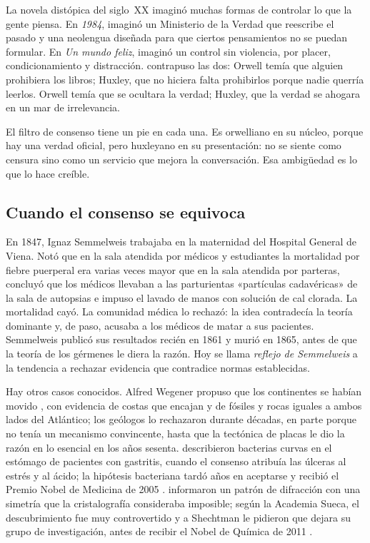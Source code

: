 \documentclass[11pt,a4paper]{article}
\begin{document}
La novela distópica del siglo~XX imaginó muchas formas de controlar lo que la gente piensa. En \emph{1984}, \textcite{orwell1949} imaginó un Ministerio de la Verdad que reescribe el pasado y una neolengua diseñada para que ciertos pensamientos no se puedan formular. En \emph{Un mundo feliz}, \textcite{huxley1932} imaginó un control sin violencia, por placer, condicionamiento y distracción. \textcite{postman1985} contrapuso las dos: Orwell temía que alguien prohibiera los libros; Huxley, que no hiciera falta prohibirlos porque nadie querría leerlos. Orwell temía que se ocultara la verdad; Huxley, que la verdad se ahogara en un mar de irrelevancia.

El filtro de consenso tiene un pie en cada una. Es orwelliano en su núcleo, porque hay una verdad oficial, pero huxleyano en su presentación: no se siente como censura sino como un servicio que mejora la conversación. Esa ambigüedad es lo que lo hace creíble.

\subsection{Cuando el consenso se equivoca}\label{sec:casos}

En 1847, Ignaz Semmelweis trabajaba en la maternidad del Hospital General de Viena. Notó que en la sala atendida por médicos y estudiantes la mortalidad por fiebre puerperal era varias veces mayor que en la sala atendida por parteras, concluyó que los médicos llevaban a las parturientas «partículas cadavéricas» de la sala de autopsias e impuso el lavado de manos con solución de cal clorada. La mortalidad cayó. La comunidad médica lo rechazó: la idea contradecía la teoría dominante y, de paso, acusaba a los médicos de matar a sus pacientes. Semmelweis publicó sus resultados recién en 1861 \parencite{semmelweis1861} y murió en 1865, antes de que la teoría de los gérmenes le diera la razón. Hoy se llama \emph{reflejo de Semmelweis} a la tendencia a rechazar evidencia que contradice normas establecidas.

Hay otros casos conocidos. Alfred Wegener propuso que los continentes se habían movido \parencite{wegener1915}, con evidencia de costas que encajan y de fósiles y rocas iguales a ambos lados del Atlántico; los geólogos lo rechazaron durante décadas, en parte porque no tenía un mecanismo convincente, hasta que la tectónica de placas le dio la razón en lo esencial en los años sesenta. \textcite{warren1983} describieron bacterias curvas en el estómago de pacientes con gastritis, cuando el consenso atribuía las úlceras al estrés y al ácido; la hipótesis bacteriana tardó años en aceptarse y recibió el Premio Nobel de Medicina de 2005 \parencite{nobel2005}. \textcite{shechtman1984} informaron un patrón de difracción con una simetría que la cristalografía consideraba imposible; según la Academia Sueca, el descubrimiento fue muy controvertido y a Shechtman le pidieron que dejara su grupo de investigación, antes de recibir el Nobel de Química de 2011 \parencite{nobel2011}.
\end{document}
